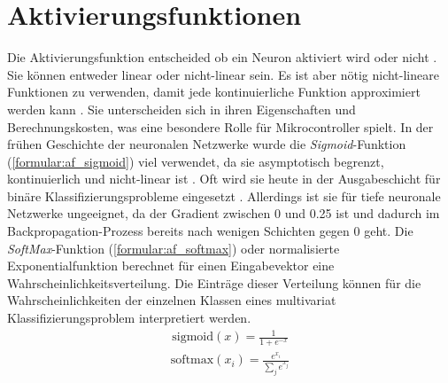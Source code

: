 \section{Aktivierungsfunktionen}
Die Aktivierungsfunktion entscheided ob ein Neuron aktiviert wird oder nicht \cite{nwankpa2018activation}.
Sie können entweder linear oder nicht-linear sein.
Es ist aber nötig nicht-lineare Funktionen zu verwenden, damit jede kontinuierliche Funktion approximiert werden kann \cite{apicella2021survey}.
Sie unterscheiden sich in ihren Eigenschaften und Berechnungskosten, was eine besondere Rolle für Mikrocontroller spielt.
\newline
\newline
In der frühen Geschichte der neuronalen Netzwerke wurde die \textit{Sigmoid}-Funktion (\ref{formular:af_sigmoid}) viel verwendet, da sie asymptotisch begrenzt,
kontinuierlich und nicht-linear ist \cite{apicella2021survey}.
Oft wird sie heute in der Ausgabeschicht für binäre Klassifizierungsprobleme eingesetzt \cite{nwankpa2018activation}.
Allerdings ist sie für tiefe neuronale Netzwerke ungeeignet, da der Gradient zwischen 0 und 0.25 ist und dadurch im
Backpropagation-Prozess bereits nach wenigen Schichten gegen 0 geht.
Die \textit{SoftMax}-Funktion (\ref{formular:af_softmax}) oder normalisierte Exponentialfunktion berechnet für einen Eingabevektor eine Wahrscheinlichkeitsverteilung.
Die Einträge dieser Verteilung können für die Wahrscheinlichkeiten der einzelnen Klassen eines multivariat Klassifizierungsproblem interpretiert werden.
\begin{align}
    \label{formular:af_sigmoid}
    \text{sigmoid}(x) = \frac{1}{1 + e^{-x}}
\end{align}
\begin{align}
    \label{formular:af_softmax}
    \text{softmax}(x_i) = \frac{e^{x_i}}{\sum_j e^{x_j}}
\end{align}
